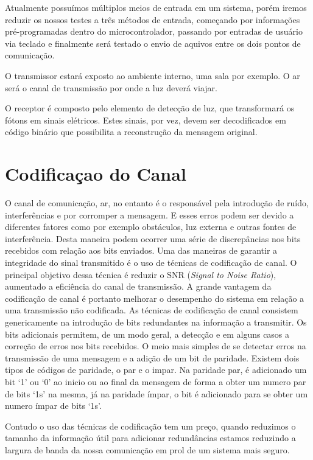 Atualmente possuímos múltiplos meios de entrada em um sistema, porém iremos reduzir os nossos testes a três métodos de entrada, começando por informações pré-programadas dentro do microcontrolador, passando por entradas de usuário via teclado e finalmente será testado o envio de aquivos entre os dois pontos de comunicação.
 
O transmissor estará exposto ao ambiente interno, uma sala por exemplo. O ar será o canal de transmissão por onde a luz deverá viajar. 

O receptor é composto pelo elemento de detecção de luz, que transformará os fótons em sinais elétricos. Estes sinais, por vez, devem ser decodificados em código binário que possibilita a reconstrução da mensagem original.

\section{Codificaçao do Canal}

O canal de comunicação, ar, no entanto é o responsável pela introdução de ruído, interferências e por corromper a mensagem. E esses erros podem ser devido a diferentes fatores como por exemplo obstáculos, luz externa e outras fontes de interferência. Desta maneira podem ocorrer uma série de discrepâncias nos bits recebidos com relação aos bits enviados.
Uma das maneiras de garantir a integridade do sinal transmitido é o uso de técnicas de codificação de canal. O principal objetivo dessa técnica é reduzir o SNR (\textit{Signal to Noise Ratio}), aumentado a eficiência do canal de transmissão.
A grande vantagem da codificação de canal é portanto melhorar o desempenho do sistema em relação a uma transmissão não codificada.
As técnicas de codificação de canal consistem genericamente na introdução de bits redundantes na informação a transmitir. Os bits adicionais permitem, de um modo geral, a detecção e em alguns casos a correção de erros nos bits recebidos. O meio mais simples de se detectar erros na transmissão de uma mensagem e a adição de um bit de paridade. 
Existem dois tipos de códigos de paridade, o par e o impar. Na paridade par, é adicionado um bit \lq 1\rq \: ou \lq 0\rq \: ao inicio ou ao final da mensagem de forma a obter um numero par de bits \lq 1s\rq \: na mesma, já na paridade ímpar, o bit é adicionado para se obter um numero ímpar de bits \lq 1s\rq.

Contudo o uso das técnicas de codificação tem um preço, quando reduzimos o tamanho da informação útil para adicionar redundâncias estamos reduzindo a largura de banda da nossa comunicação em prol de um sistema mais seguro. 

